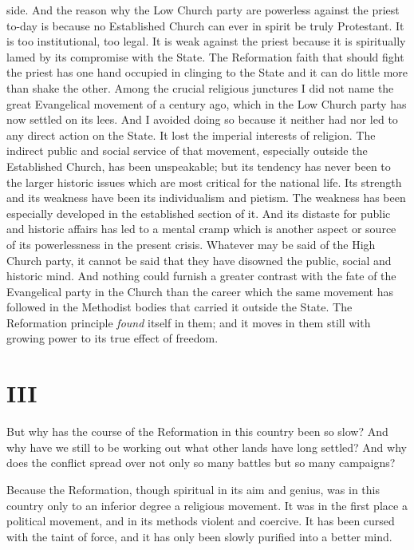 \documentclass[12pt,a5paper,twoside]{book}
\begin{document}
side. And the reason why the Low Church 
party are powerless against the priest to-day is because 
no Established Church can ever in spirit be truly 
Protestant. It is too institutional, too legal. It is 
weak against the priest because it is spiritually lamed 
by its compromise with the State. The Reformation 
faith that should fight the priest has one hand occupied 
in clinging to the State and it can do little more 
than shake the other. Among the crucial religious 
junctures I did not name the great Evangelical movement 
of a century ago, which in the Low Church 
party has now settled on its lees. And I avoided doing 
so because it neither had nor led to any direct action 
on the State. It lost the imperial interests of religion. 
The indirect public and social service of that movement, 
especially outside the Established Church, has 
been unspeakable; but its tendency has never been to 
the larger historic issues which are most critical for 
the national life. Its strength and its weakness have 
been its individualism and pietism. The weakness has 
been especially developed in the established section of 
it. And its distaste for public and historic affairs has 
led to a mental cramp which is another aspect or 
source of its powerlessness in the present crisis. 
Whatever may be said of the High Church party, it 
cannot be said that they have disowned the public, 
social and historic mind. And nothing could furnish 
a greater contrast with the fate of the Evangelical 
party in the Church than the career which the same 
movement has followed in the Methodist bodies that 
carried it outside the State. The Reformation principle 
\textit{found} itself in them; and it moves in them still 
with growing power to its true effect of freedom. 

\section*{III}

But why has the course of the Reformation in this 
country been so slow? And why have we still to be 
working out what other lands have long settled? 
And why does the conflict spread over not only so 
many battles but so many campaigns? 

Because the Reformation, though spiritual in its 
aim and genius, was in this country only to an inferior 
degree a religious movement. It was in the 
first place a political movement, and in its methods 
violent and coercive. It has been cursed with the 
taint of force, and it has only been slowly purified 
into a better mind. 
\end{document}
